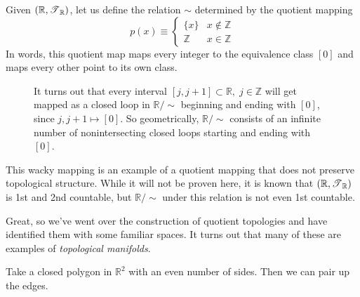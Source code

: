     \begin{example}
      Given $(\mathbb{R}, \T_{\mathbb{R}})$, let us define the relation $\sim$ determined by the quotient mapping 
      \begin{equation}
        p(x) \equiv \begin{cases} \{x\} & x \not\in \mathbb{Z} \\ \mathbb{Z} & x \in \mathbb{Z} \end{cases}
      \end{equation}
      In words, this quotient map maps every integer to the equivalence class $[0]$ and maps every other point to its own class. 

      \begin{figure}[H]
        \centering 
        \caption{It turns out that every interval $[j, j+1] \subset \mathbb{R}, \; j \in \mathbb{Z}$ will get mapped as a closed loop in $\mathbb{R} / \sim$ beginning and ending with $[0]$, since $j, j+1 \mapsto [0]$. So geometrically, $\mathbb{R} / \sim$ consists of an infinite number of nonintersecting closed loops starting and ending with $[0]$. }
        \label{fig:integer}
      \end{figure}

      This wacky mapping is an example of a quotient mapping that does not preserve topological structure. While it will not be proven here, it is known that $(\mathbb{R}, \T_{\mathbb{R}})$ is 1st and 2nd countable, but $\mathbb{R} / \sim$ under this relation is not even 1st countable. 
    \end{example} 

    Great, so we've went over the construction of quotient topologies and have identified them with some familiar spaces. It turns out that many of these are examples of \textit{topological manifolds}. 

    \begin{definition}
      Take a closed polygon in $\mathbb{R}^2$ with an even number of sides. Then we can pair up the edges. 
    \end{definition}

